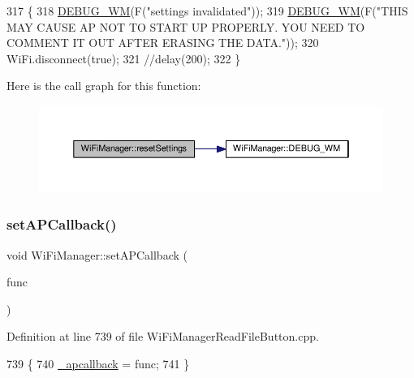 \begin{DoxyCode}
317                                 \{
318   \hyperlink{class_wi_fi_manager_ae5f595c670ccbcf9a191baf50f5c7c26}{DEBUG\_WM}(F(\textcolor{stringliteral}{"settings invalidated"}));
319   \hyperlink{class_wi_fi_manager_ae5f595c670ccbcf9a191baf50f5c7c26}{DEBUG\_WM}(F(\textcolor{stringliteral}{"THIS MAY CAUSE AP NOT TO START UP PROPERLY. YOU NEED TO COMMENT IT OUT AFTER ERASING
       THE DATA."}));
320   WiFi.disconnect(\textcolor{keyword}{true});
321   \textcolor{comment}{//delay(200);}
322 \}
\end{DoxyCode}
Here is the call graph for this function\+:
\nopagebreak
\begin{figure}[H]
\begin{center}
\leavevmode
\includegraphics[width=350pt]{d4/dc8/class_wi_fi_manager_a0027749816b6c66bc845d7c5db760a33_cgraph}
\end{center}
\end{figure}
\mbox{\label{class_wi_fi_manager_a353ab556f96020ad7a08e9a91cea8bea}} 
\subsubsection{\texorpdfstring{set\+A\+P\+Callback()}{setAPCallback()}}
{\footnotesize\ttfamily void Wi\+Fi\+Manager\+::set\+A\+P\+Callback (\begin{DoxyParamCaption}\item[{void($\ast$)(\hyperlink{class_wi_fi_manager}{Wi\+Fi\+Manager} $\ast$)}]{func }\end{DoxyParamCaption})}



Definition at line 739 of file Wi\+Fi\+Manager\+Read\+File\+Button.\+cpp.


\begin{DoxyCode}
739                                                                           \{
740   \hyperlink{class_wi_fi_manager_ad166247d94aef10a3a8aa34da1351b27}{\_apcallback} = func;
741 \}
\end{DoxyCode}
\mbox{\label{class_wi_fi_manager_a70007205081cd9bfe4123b65553adf42}} 
